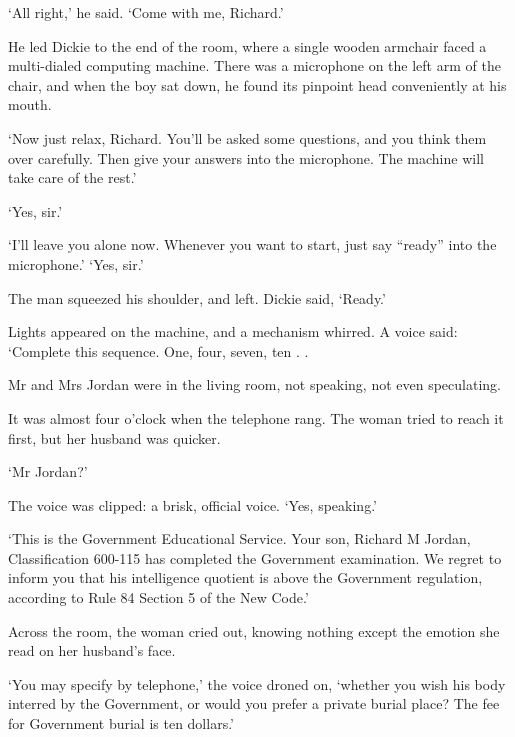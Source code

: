 \documentclass[10pt,a4paper]{article}
\begin{document}
‘All right,’ he said. ‘Come with me, Richard.’

He led Dickie to the end of the room, where a single wooden armchair faced a multi-dialed computing machine. There was a microphone on the left arm of the chair, and when the boy sat down, he found its pinpoint head conveniently at his mouth.

‘Now just relax, Richard. You’ll be asked some questions, and you think them over carefully. Then give your answers into the microphone. The machine will take care of the rest.’

‘Yes, sir.’

‘I’ll leave you alone now. Whenever you want to start, just say “ready” into the microphone.’ ‘Yes, sir.’

The man squeezed his shoulder, and left. Dickie said, ‘Ready.’

Lights appeared on the machine, and a mechanism whirred. A voice said: ‘Complete this sequence. One, four, seven, ten . .

Mr and Mrs Jordan were in the living room, not speaking, not even speculating.

It was almost four o’clock when the telephone rang. The woman tried to reach it first, but her husband was quicker.

‘Mr Jordan?’

The voice was clipped: a brisk, official voice. ‘Yes, speaking.’

‘This is the Government Educational Service. Your son, Richard M Jordan, Classification 600-115 has completed the Government examination. We regret to inform you that his intelligence quotient is above the Government regulation, according to Rule 84 Section 5 of the New Code.’

Across the room, the woman cried out, knowing nothing except the emotion she read on her husband’s face.

‘You may specify by telephone,’ the voice droned on, ‘whether you wish his body interred by the Government, or would you prefer a private burial place? The fee for Government burial is ten dollars.’
\end{document}
